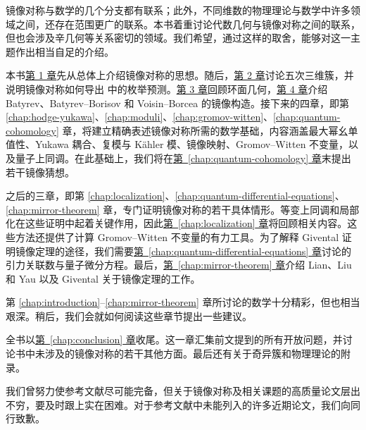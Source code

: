 镜像对称与数学的几个分支都有联系；此外，不同维数的物理理论与数学中许多领域之间，还存在范围更广的联系。本书着重讨论代数几何与镜像对称之间的联系，但也会涉及辛几何等关系密切的领域。我们希望，通过这样的取舍，能够对这一主题作出相当自足的介绍。

本书\hyperref[chap:introduction]{第 1 章}先从总体上介绍镜像对称的思想。随后，\hyperref[chap:quintic]{第 2 章}讨论五次三维簇，并说明镜像对称如何导出  中的枚举预测。\hyperref[chap:toric]{第 3 章}回顾环面几何，\hyperref[chap:mirror-constructions]{第 4 章}介绍 Batyrev、Batyrev--Borisov 和 Voisin--Borcea 的镜像构造。接下来的四章，即第 \hyperref[chap:hodge-yukawa]{\ref*{chap:hodge-yukawa}}、\hyperref[chap:moduli]{\ref*{chap:moduli}}、\hyperref[chap:gromov-witten]{\ref*{chap:gromov-witten}}、\hyperref[chap:quantum-cohomology]{\ref*{chap:quantum-cohomology}} 章，将建立精确表述镜像对称所需的数学基础，内容涵盖最大幂幺单值性、Yukawa 耦合、复模与 Kähler 模、镜像映射、Gromov--Witten 不变量，以及量子上同调。在此基础上，我们将在\hyperref[chap:quantum-cohomology]{第~\ref*{chap:quantum-cohomology} 章}末提出若干镜像猜想。

之后的三章，即第 \hyperref[chap:localization]{\ref*{chap:localization}}、\hyperref[chap:quantum-differential-equations]{\ref*{chap:quantum-differential-equations}}、\hyperref[chap:mirror-theorem]{\ref*{chap:mirror-theorem}} 章，专门证明镜像对称的若干具体情形。等变上同调和局部化在这些证明中起着关键作用，因此\hyperref[chap:localization]{第~\ref*{chap:localization} 章}将回顾相关内容。这些方法还提供了计算 Gromov--Witten 不变量的有力工具。为了解释 Givental 证明镜像定理的途径，我们需要\hyperref[chap:quantum-differential-equations]{第~\ref*{chap:quantum-differential-equations} 章}讨论的引力关联数与量子微分方程。最后，\hyperref[chap:mirror-theorem]{第~\ref*{chap:mirror-theorem} 章}介绍 Lian、Liu 和 Yau  以及 Givental  关于镜像定理的工作。

第 \hyperref[chap:introduction]{\ref*{chap:introduction}}--\hyperref[chap:mirror-theorem]{\ref*{chap:mirror-theorem}} 章所讨论的数学十分精彩，但也相当艰深。稍后，我们会就如何阅读这些章节提出一些建议。

全书以\hyperref[chap:conclusion]{第~\ref*{chap:conclusion} 章}收尾。这一章汇集前文提到的所有开放问题，并讨论书中未涉及的镜像对称的若干其他方面。最后还有关于奇异簇和物理理论的附录。

我们曾努力使参考文献尽可能完备，但关于镜像对称及相关课题的高质量论文层出不穷，要及时跟上实在困难。对于参考文献中未能列入的许多近期论文，我们向同行致歉。


